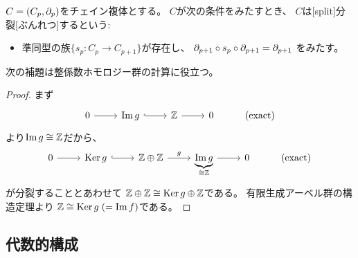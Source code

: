 \documentclass[report]{jlreq}
\begin{document}
\begin{definition}[分裂]
    $C = (C_p, \partial_p)$をチェイン複体とする。
    $C$が次の条件をみたすとき、
    $C$は[split]{分裂}[ぶんれつ]するという:
    \begin{itemize}
        \item 準同型の族$\{ s_p \colon C_p \to C_{p + 1} \}$が存在し、
            $\partial_{p + 1} \circ s_p \circ \partial_{p + 1} = \partial_{p + 1}$
            をみたす。
    \end{itemize}
\end{definition}

次の補題は整係数ホモロジー群の計算に役立つ。


\begin{proof}
    まず
    \begin{equation}
        \begin{tikzcd}
            0 \ar{r}
                & \Im g \ar[hook]{r}
                & \Z \ar{r}
                & 0
                & (\text{exact})
        \end{tikzcd}
    \end{equation}
    より$\operatorname{\mathrm{Im}} g \cong \mathbb{Z}$だから、
    \begin{equation}
        \begin{tikzcd}
            0 \ar{r}
                & \Ker g \ar[hook]{r}
                & \Z \oplus \Z \ar{r}{g}
                & \underbrace{\Im g}_{\cong \Z} \ar{r}
                & 0
                & (\text{exact})
        \end{tikzcd}
    \end{equation}
    が分裂することとあわせて
    $\mathbb{Z} \oplus \mathbb{Z} \cong \operatorname{\mathrm{Ker}} g \oplus \mathbb{Z}$である。
    有限生成アーベル群の構造定理より
    $\mathbb{Z} \cong \operatorname{\mathrm{Ker}} g \; (= \operatorname{\mathrm{Im}} f)$である。
\end{proof}

\subsection{代数的構成}
\end{document}
